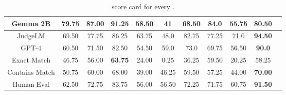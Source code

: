 \begin{table}[h]
\begin{tabular}{ccccccccccc}
Gemma 2B & 79.75 & 87.00 & \textbf{91.25} & 58.50 & 41 & 68.50 & 84.0 & 55.75 & 80.50 \\ \midrule
JudgeLM & 69.50 & 77.75 & 86.25 & 63.75 & 48.0 & 82.75 & 77.25 & 71.0 & \textbf{94.50} \\ \midrule
GPT-4 & 60.50 & 71.50 & 82.50 & 54.50 & 59.0 & 73.0 & 69.75 & 56.50 & \textbf{90.0} \\ \midrule
Exact Match & 46.75 & 56.00 & \textbf{63.75} & 24.00 & 0.25 & 36.25 & 59.50 & 20.25 & 58.25 \\ 
Contains Match & 50.75 & 60.00 & 68.00 & 39.00 & 46.25 & 59.50 & 57.25 & 44.00 & \textbf{70.00} \\ \midrule
Human Eval & 62.50 & 72.75 & 83.75 & 56.00 & 56.50 & 72.25 & 71.75 & 60.75 & \textbf{91.50} \\
\bottomrule
\end{tabular}
 \captionsetup{skip=8pt} %
\caption{\Judgemodel score card for every \evaluatormodel.}
\end{table}

\twocolumn





